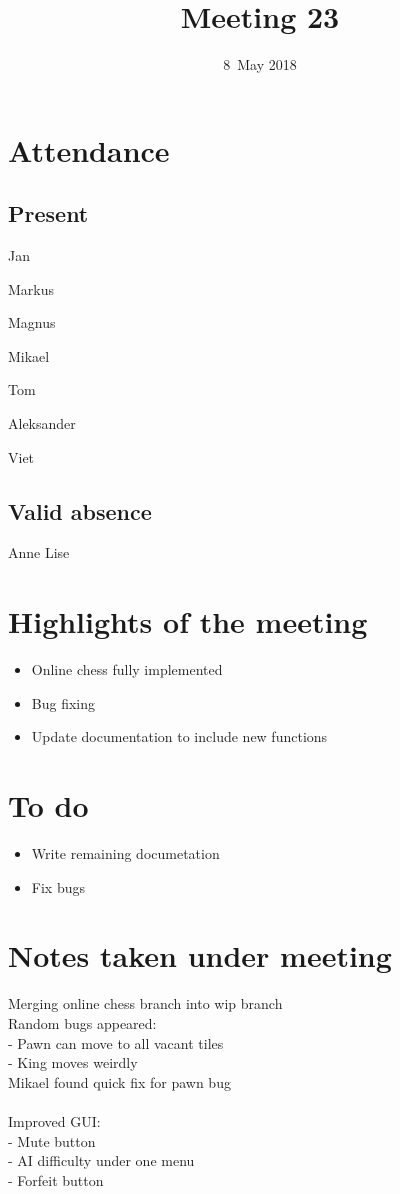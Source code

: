 \documentclass[letterpaper,11pt]{article}
\title{Meeting 23}
\date{8~May 2018}
\begin{document}
\maketitle
\section*{Attendance}
\subsection*{Present}
\begin{list}{}{}
	\item Jan
	\item Markus
	\item Magnus
	\item Mikael
	\item Tom
	\item Aleksander
	\item Viet
\end{list}

\subsection*{Valid absence}
\begin{list}{}{}
	\item Anne Lise
\end{list}

\newpage
\section*{Highlights of the meeting}
\begin{itemize}
	\item Online chess fully implemented
	\item Bug fixing
	\item Update documentation to include new functions
\end{itemize}

\section*{To do}
\begin{itemize}
	\item Write remaining documetation
	\item Fix bugs
\end{itemize}

\section*{Notes taken under meeting}
Merging online chess branch into wip branch\\
Random bugs appeared:\\
- Pawn can move to all vacant tiles\\
- King moves weirdly\\
Mikael found quick fix for pawn bug\\\\
Improved GUI:\\
- Mute button\\
- AI difficulty under one menu\\
- Forfeit button
\end{document}
